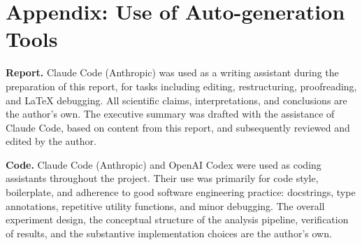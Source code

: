 \chapter*{Appendix: Use of Auto-generation Tools}

\noindent
\textbf{Report.} Claude Code (Anthropic) was used as a writing assistant 
during the preparation of this report, for tasks including editing, 
restructuring, proofreading, and LaTeX debugging. All scientific claims, 
interpretations, and conclusions are the author's own. 
The executive summary was drafted with the assistance of Claude Code,
 based on content from this report, and subsequently reviewed and 
 edited by the author.

\bigskip
\noindent
\textbf{Code.} Claude Code (Anthropic) and OpenAI Codex were 
used as coding assistants throughout the project. 
Their use was primarily for code style, boilerplate, 
and adherence to good software engineering practice: 
docstrings, type annotations, repetitive utility functions, 
and minor debugging. The overall experiment design, 
the conceptual structure of the analysis pipeline, 
verification of results, and the substantive implementation 
choices are the author's own.
